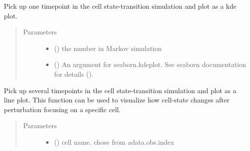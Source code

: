 \documentclass[letterpaper,10pt,english]{sphinxmanual}
\begin{document}
\begin{fulllineitems}
\begin{fulllineitems}
\label{\detokenize{modules/celloracle:celloracle.Oracle.plot_mc_result_as_kde}}
Pick up one timepoint in the cell state-transition simulation and plot as a kde plot.
\begin{quote}\begin{description}
\item[{Parameters}] \leavevmode\begin{itemize}
\item {} 
 () \textendash{} the number in Markov simulation

\item {} 
 () \textendash{} An argument for seaborn.kdeplot.
See seaborn documentation for details ().

\end{itemize}

\end{description}\end{quote}

\end{fulllineitems}


\begin{fulllineitems}
\label{\detokenize{modules/celloracle:celloracle.Oracle.plot_mc_result_as_trajectory}}
Pick up several timepoints in the cell state-transition simulation and plot as a line plot.
This function can be used to visualize how cell-state changes after perturbation focusing on a specific cell.
\begin{quote}\begin{description}
\item[{Parameters}] \leavevmode\begin{itemize}
\item {} 
 () \textendash{} cell name. chose from adata.obs.index


\end{itemize}
\end{description}
\end{quote}
\end{fulllineitems}
\end{fulllineitems}
\end{document}
